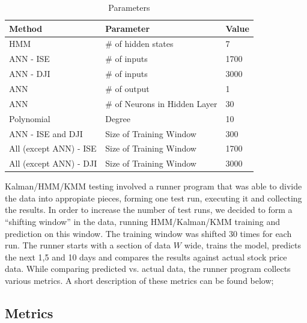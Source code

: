 \begin{table}[h]
\caption{Parameters}
\vspace{0.3cm}
\begin{tabular}{|l|l|l|}
\hline 
\textbf{Method} & \textbf{Parameter} & \textbf{Value} \\
\hline 
HMM & \# of hidden states  & 7 \\
\hline
ANN - ISE & \# of inputs & 1700 \\
\hline
ANN - DJI & \# of inputs & 3000 \\
\hline
ANN & \# of output & 1 \\
\hline
ANN & \# of Neurons in Hidden Layer & 30 \\
\hline
Polynomial & Degree & 10 \\
\hline
ANN - ISE and DJI & Size of Training Window & 300 \\
\hline
All (except ANN) - ISE & Size of Training Window & 1700 \\
\hline
All (except ANN) - DJI & Size of Training Window & 3000 \\
\hline
\end{tabular}
\end{table}


Kalman/HMM/KMM testing involved a runner program that was able to divide the
data into appropiate pieces, forming one test run, executing it and collecting
the results. In order to increase the number of test runs, we decided to form a
``shifting window'' in the data, running HMM/Kalman/KMM training and prediction
on this window. The training window was shifted 30 times for each run. The
runner starts with a section of data $W$ wide, trains the model, predicts the
next 1,5 and 10 days and compares the results against actual stock price
data. While comparing predicted vs. actual data, the runner program collects
various metrics. A short description of these metrics can be found below;

\subsection{Metrics}

